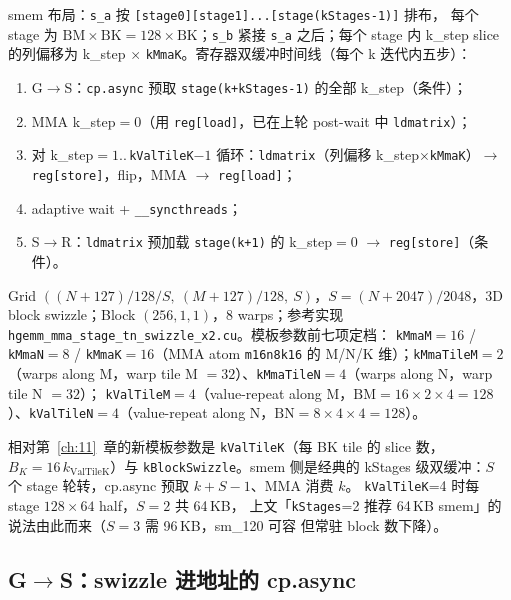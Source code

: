 smem 布局：\texttt{s\_a} 按 \texttt{[stage0][stage1]...[stage(kStages-1)]} 排布，
每个 stage 为 $\mathrm{BM} \times \mathrm{BK} = 128 \times \mathrm{BK}$；\texttt{s\_b}
紧接 \texttt{s\_a} 之后；每个 stage 内 k\_step slice 的列偏移为 k\_step $\times$
\texttt{kMmaK}。寄存器双缓冲时间线（每个 k 迭代内五步）：

\begin{enumerate}
  \item G$\to$S：\texttt{cp.async} 预取 \texttt{stage(k+kStages-1)} 的全部
        k\_step（条件）；
  \item MMA k\_step$=0$（用 \texttt{reg[load]}，已在上轮 post-wait 中
        \texttt{ldmatrix}）；
  \item 对 k\_step$=1..\,$\texttt{kValTileK}$-1$ 循环：\texttt{ldmatrix}（列偏移
        k\_step$\times$\texttt{kMmaK}）$\to$ \texttt{reg[store]}，flip，MMA $\to$
        \texttt{reg[load]}；
  \item adaptive wait + \texttt{\_\_syncthreads}；
  \item S$\to$R：\texttt{ldmatrix} 预加载 \texttt{stage(k+1)} 的 k\_step$=0$
        $\to$ \texttt{reg[store]}（条件）。
\end{enumerate}

Grid $((N{+}127)/128/S,\ (M{+}127)/128,\ S)$，$S=(N{+}2047)/2048$，3D block
swizzle；Block $(256,1,1)$，8 warps；参考实现
\texttt{hgemm\_mma\_stage\_tn\_swizzle\_x2.cu}。模板参数前七项定档：
\texttt{kMmaM}$=16$ / \texttt{kMmaN}$=8$ / \texttt{kMmaK}$=16$（MMA atom
\texttt{m16n8k16} 的 M/N/K 维）；\texttt{kMmaTileM}$=2$（warps along M，warp
tile M $= 32$）、\texttt{kMmaTileN}$=4$（warps along N，warp tile N $= 32$）；
\texttt{kValTileM}$=4$（value-repeat along M，$\mathrm{BM} = 16\times2\times4 =
128$）、\texttt{kValTileN}$=4$（value-repeat along N，$\mathrm{BN} = 8\times4\times4
= 128$）。



相对第~\ref{ch:11}~章的新模板参数是 \texttt{kValTileK}（每 BK tile 的 slice 数，
$B_K=16\,k_{\mathrm{ValTileK}}$）与 \texttt{k\allowbreak{}Block\allowbreak{}Swizzle}。smem 侧是经典的
kStages 级双缓冲：$S$ 个 stage 轮转，cp.async 预取 $k{+}S{-}1$、MMA 消费 $k$。
\texttt{kValTileK}{=}4 时每 stage $128{\times}64$ half，$S{=}2$ 共 64\,KB，
上文「\texttt{kStages}{=}2 推荐 64\,KB smem」的说法由此而来（$S{=}3$ 需 96\,KB，sm\_120 可容
但常驻 block 数下降）。

\subsection{G$\to$S：swizzle 进地址的 cp.async}

